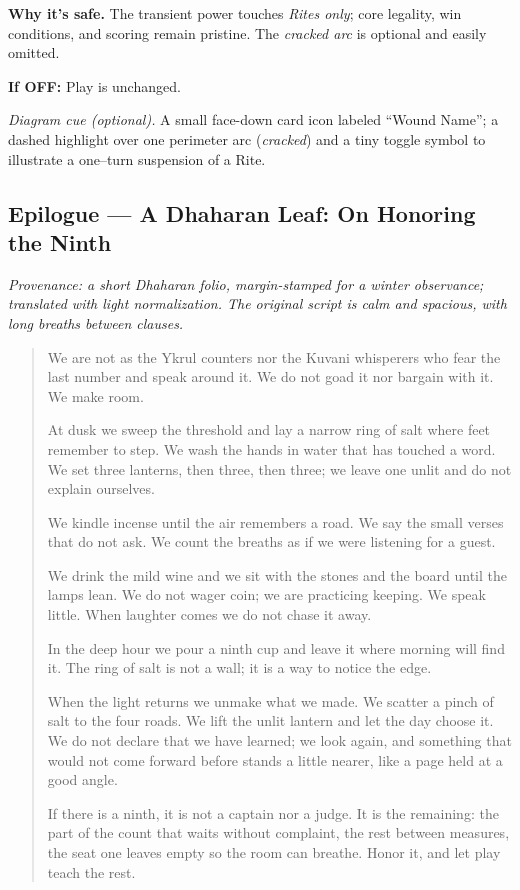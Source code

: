 \documentclass[11pt]{article}
\begin{document}
\medskip
\noindent\textbf{Why it’s safe.} The transient power touches \emph{Rites only}; core legality, win conditions, and scoring remain pristine. The \emph{cracked arc} is optional and easily omitted.

\medskip
\noindent\textbf{If \textsc{OFF}:} Play is unchanged.

\medskip
\noindent\textit{Diagram cue (optional).} A small face-down card icon labeled “Wound Name”; a dashed highlight over one perimeter arc (\emph{cracked}) and a tiny toggle symbol to illustrate a one–turn suspension of a Rite.

\subsection{Epilogue — A Dhaharan Leaf: On Honoring the Ninth}
\label{epilogue:dhahara-ninth}
{}

\noindent\textit{Provenance: a short Dhaharan folio, margin-stamped for a winter observance; translated with light normalization. The original script is calm and spacious, with long breaths between clauses.}

\medskip
\begin{quote}\small
We are not as the Ykrul counters nor the Kuvani whisperers who fear the last number and speak around it. We do not goad it nor bargain with it. We make room.

At dusk we sweep the threshold and lay a narrow ring of salt where feet remember to step. We wash the hands in water that has touched a word. We set three lanterns, then three, then three; we leave one unlit and do not explain ourselves.

We kindle incense until the air remembers a road. We say the small verses that do not ask. We count the breaths as if we were listening for a guest.

We drink the mild wine and we sit with the stones and the board until the lamps lean. We do not wager coin; we are practicing keeping. We speak little. When laughter comes we do not chase it away.

In the deep hour we pour a ninth cup and leave it where morning will find it. The ring of salt is not a wall; it is a way to notice the edge.

When the light returns we unmake what we made. We scatter a pinch of salt to the four roads. We lift the unlit lantern and let the day choose it. We do not declare that we have learned; we look again, and something that would not come forward before stands a little nearer, like a page held at a good angle.

If there is a ninth, it is not a captain nor a judge. It is the remaining: the part of the count that waits without complaint, the rest between measures, the seat one leaves empty so the room can breathe. Honor it, and let play teach the rest.
\end{quote}
\end{document}
